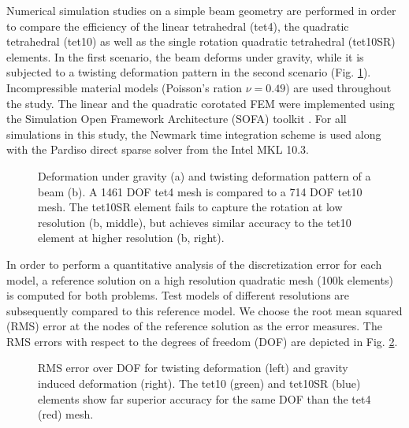 Numerical simulation studies on a simple beam geometry are performed in order to compare the efficiency of the linear tetrahedral (tet4), the quadratic tetrahedral (tet10) as well as the single rotation quadratic tetrahedral (tet10SR) elements. In the first scenario, the beam deforms under gravity, while it is subjected to a twisting deformation pattern in the second scenario (Fig. \ref{BeamTwistAndGravity}). Incompressible material models (Poisson's ration $\nu=0.49$) are used throughout the study. The linear and the quadratic corotated FEM were implemented using the Simulation Open Framework Architecture (SOFA) toolkit \cite{Faure2012}. For all simulations in this study, the Newmark time integration scheme is used along with the Pardiso direct sparse solver from the Intel MKL 10.3.

\begin{figure}
   \centering   
	\caption{Deformation under gravity (a) and twisting deformation pattern of a beam (b). A 1461 DOF tet4 mesh is compared to a 714 DOF tet10 mesh. The tet10SR element fails to capture the rotation at low resolution (b, middle), but achieves similar accuracy to the tet10 element at higher resolution (b, right).}
\label{BeamTwistAndGravity}
\end{figure}

In order to perform a quantitative analysis of the discretization error for each model, a reference solution on a high resolution quadratic mesh (100k elements) is computed for both problems. Test models of different resolutions are subsequently compared to this reference model.  We choose the root mean squared (RMS) error at the nodes of the reference solution as the error measures. The RMS errors with respect to the degrees of freedom (DOF) are depicted in Fig. \ref{ConvergenceQuadraticBeam}.

\begin{figure}
   \centering   
	\caption{RMS error over DOF for twisting deformation (left) and gravity induced deformation (right). The tet10 (green) and tet10SR (blue) elements show far superior accuracy for the same DOF than the tet4 (red) mesh.}
\label{ConvergenceQuadraticBeam}
\end{figure}

